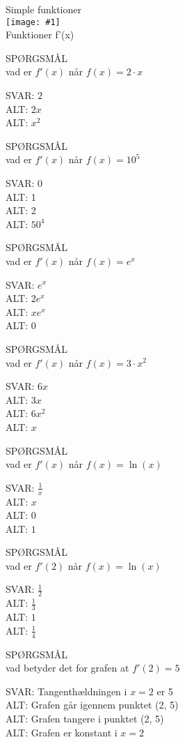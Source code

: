 \documentclass[]{article}
\newenvironment{question}[2]{SPØRGSMÅL\\}{\hspace{50px}}
\newcommand{\name}[1]{{\huge #1}\\}
\newcommand{\tag}[1]{#1}
\newcommand{\cover}[1]{\texttt{[image: \#1]}\\}
\newcommand{\answer}[1]{{\color{green} SVAR: #1}\\}
\newcommand{\alt}[1]{{\color{red} ALT: #1}\\}
\begin{document}
\name{Simple funktioner}
\cover{tangent.png}
\tag{Funktioner}
\tag{f'(x)}

\begin{question}{multi}
	
	Hvad er $f'(x)$ når $f(x)=2\cdot x$
	
	\answer{$2$}
	\alt{$2x$}
	\alt{$x^2$}
	
	\end{question}
	
	\begin{question}{multi}
		
		Hvad er $f'(x)$ når $f(x)=10^5$
		
		\answer{$0$}
		\alt{1}
		\alt{2}
		\alt{$50^4$}
		
	\end{question}
	
	\begin{question}{multi}
		
		Hvad er $f'(x)$ når $f(x)=e^x$
		
		\answer{$e^x$}
		\alt{$2e^x$}
		\alt{$xe^x$}
		\alt{$0$}
		
	\end{question}
	
	\begin{question}{multi}
		
		Hvad er $f'(x)$ når $f(x)=3\cdot x^2$
		
		\answer{$6 x$}
		\alt{$3x$}
		\alt{$6x^2$}
		\alt{$x$}
		
	\end{question}
	
	\begin{question}{multi}
		
		Hvad er $f'(x)$ når $f(x)=\ln(x)$
		
		\answer{$\frac{1}{x}$}
		\alt{$x$}
		\alt{$0$}
		\alt{$1$}
		
	\end{question}
	
	\begin{question}{multi}
		
		Hvad er $f'(2)$ når $f(x)=\ln(x)$
		
		\answer{$\frac{1}{2}$}
		\alt{$\frac{1}{3}$}
		\alt{$1$}
		\alt{$\frac{1}{4}$}
		
	\end{question}
	
	\begin{question}{multi}
		
		Hvad betyder det for grafen at $f'(2)=5$
		
		\answer{Tangenthældningen i $x=2$ er 5}
		\alt{Grafen går igennem punktet (2, 5)}
		\alt{Grafen tangere i punktet (2, 5)}
		\alt{Grafen er konstant i $x=2$}
		
	\end{question}
\end{document}
